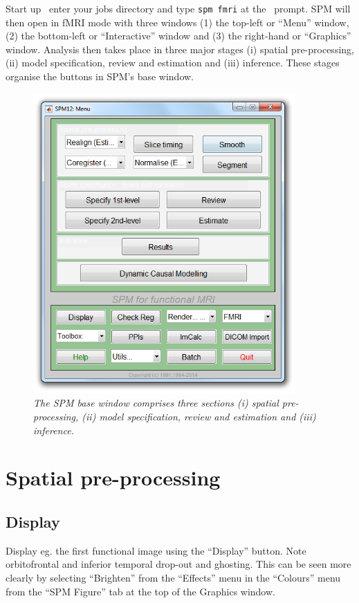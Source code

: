 Start up \matlab\, enter your jobs directory and type \texttt{spm fmri} at the \matlab\ prompt. SPM will then open in fMRI mode with three windows (1) the top-left or ``Menu'' window, (2) the bottom-left or ``Interactive'' window and (3) the right-hand or ``Graphics'' window. 
Analysis then takes place in three major stages (i) spatial pre-processing, (ii) model specification, review and estimation and (iii) inference. These stages organise the buttons in SPM's base window.
\begin{figure}
\begin{center}
\includegraphics[width=100mm]{faces/command}
\caption{\em The SPM base window comprises three sections (i) spatial pre-processing, (ii) model specification, review and estimation and (iii) inference. \label{command}}
\end{center}
\end{figure}

\section{Spatial pre-processing}

\subsection{Display}

Display eg. the first functional image using the ``Display'' button. Note orbitofrontal and inferior temporal drop-out and ghosting. This can be seen more clearly by selecting ``Brighten'' from the ``Effects'' menu in the ``Colours'' menu from the ``SPM Figure'' tab at the top of the Graphics window.

